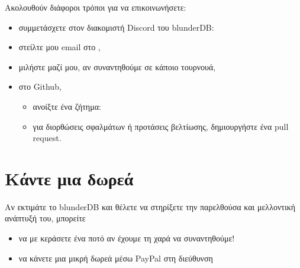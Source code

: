 \documentclass[letterpaper,10pt,greek]{sphinxmanual}
\begin{document}
\sphinxAtStartPar
Ακολουθούν διάφοροι τρόποι για να επικοινωνήσετε:
\begin{itemize}
\item {} 
\sphinxAtStartPar
συμμετάσχετε στον διακομιστή Discord του blunderDB: 

\item {} 
\sphinxAtStartPar
στείλτε μου email στο ,

\item {} 
\sphinxAtStartPar
μιλήστε μαζί μου, αν συναντηθούμε σε κάποιο τουρνουά,

\item {} 
\sphinxAtStartPar
στο Github,
\begin{itemize}
\item {} 
\sphinxAtStartPar
ανοίξτε ένα ζήτημα: 

\item {} 
\sphinxAtStartPar
για διορθώσεις σφαλμάτων ή προτάσεις βελτίωσης, δημιουργήστε ένα pull request.

\end{itemize}

\end{itemize}


\chapter{Κάντε μια δωρεά}
\label{\detokenize{index:faire-un-don}}
\sphinxAtStartPar
Αν εκτιμάτε το blunderDB και θέλετε να στηρίξετε την παρελθούσα και μελλοντική ανάπτυξή του, μπορείτε
\begin{itemize}
\item {} 
\sphinxAtStartPar
να με κεράσετε ένα ποτό αν έχουμε τη χαρά να συναντηθούμε!

\item {} 
\sphinxAtStartPar
να κάνετε μια μικρή δωρεά μέσω PayPal στη διεύθυνση 

\end{itemize}
\end{document}
